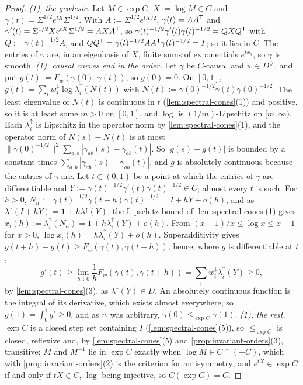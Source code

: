 \begin{proof}
\emph{(1), the geodesic.} Let $M \in \exp C$, $X := \log M \in C$ and $\gamma(t) = \Sigma^{1/2}e^{tX}\Sigma^{1/2}$.
With $A := \Sigma^{1/2}e^{tX/2}$, $\gamma(t) = AA^{\mathsf{T}}$ and $\gamma'(t) = \Sigma^{1/2}Xe^{tX}\Sigma^{1/2} =
AXA^{\mathsf{T}}$, so $\gamma(t)^{-1/2}\gamma'(t)\gamma(t)^{-1/2} = QXQ^{\mathsf{T}}$ with $Q := \gamma(t)^{-1/2}A$, and
$QQ^{\mathsf{T}} = \gamma(t)^{-1/2}AA^{\mathsf{T}}\gamma(t)^{-1/2} = I$; so it lies in $C$. The entries of $\gamma$ are, in an
eigenbasis of $X$, finite sums of exponentials $e^{tx_k}$, so $\gamma$ is smooth.
\emph{(1), causal curves end in the order.} Let $\gamma$ be $C$-causal and $w \in D^\#$, and put
$g(t) := F_w(\gamma(0), \gamma(t))$, so $g(0) = 0$. On $[0,1]$, $g(t) = \sum_iw^\downarrow_i\log
\lambda^\uparrow_i(N(t))$ with $N(t) := \gamma(0)^{-1/2}\gamma(t)\gamma(0)^{-1/2}$. The least eigenvalue of
$N(t)$ is continuous in $t$ (\ref{lem:spectral-cones}(1)) and positive, so it is at least some $m > 0$ on
$[0,1]$, and $\log$ is $(1/m)$-Lipschitz on $[m, \infty)$. Each $\lambda^\uparrow_i$ is Lipschitz in the
operator norm by \ref{lem:spectral-cones}(1), and the operator norm of $N(s) - N(t)$ is at most
$\|\gamma(0)^{-1/2}\|^2\sum_{a,b}|\gamma_{ab}(s) - \gamma_{ab}(t)|$. So $|g(s) - g(t)|$ is bounded by a
constant times $\sum_{a,b}|\gamma_{ab}(s) - \gamma_{ab}(t)|$, and $g$ is absolutely continuous because the
entries of $\gamma$ are. Let $t \in (0,1)$ be a point at which the entries of $\gamma$ are differentiable and
$Y := \gamma(t)^{-1/2}\gamma'(t)\gamma(t)^{-1/2} \in C$; almost every $t$ is such. For $h > 0$,
$N_h := \gamma(t)^{-1/2}\gamma(t+h)\gamma(t)^{-1/2} = I + hY + o(h)$, and as $\lambda^\uparrow(I + hY) =
\mathbf 1 + h\lambda^\uparrow(Y)$, the Lipschitz bound of \ref{lem:spectral-cones}(1) gives
$x_i(h) := \lambda^\uparrow_i(N_h) = 1 + h\lambda^\uparrow_i(Y) + o(h)$. From $(x - 1)/x \le \log x \le x - 1$
for $x > 0$, $\log x_i(h) = h\lambda^\uparrow_i(Y) + o(h)$. Superadditivity gives
$g(t+h) - g(t) \ge F_w(\gamma(t), \gamma(t+h))$, hence, where $g$ is differentiable at $t$,
\[
  g'(t) \ge \lim_{h\downarrow0}\frac1hF_w(\gamma(t), \gamma(t+h)) = \sum_iw^\downarrow_i\lambda^\uparrow_i(Y) \ge 0 ,
\]
by \ref{lem:spectral-cones}(3), as $\lambda^\uparrow(Y) \in D$. An absolutely continuous function is the
integral of its derivative, which exists almost everywhere; so $g(1) = \int_0^1g' \ge 0$, and as $w$ was
arbitrary, $\gamma(0) \le_{\exp C} \gamma(1)$. \emph{(1), the rest.} $\exp C$ is a closed step set
containing $I$ (\ref{lem:spectral-cones}(5)), so $\le_{\exp C}$ is closed, reflexive and, by
\ref{lem:spectral-cones}(5) and \ref{prop:invariant-orders}(3), transitive; $M$ and $M^{-1}$ lie in
$\exp C$ exactly when $\log M \in C \cap (-C)$, which with \ref{prop:invariant-orders}(2) is the criterion
for antisymmetry; and $e^{tX} \in \exp C$ if and only if $tX \in C$, $\log$ being injective, so
$C(\exp C) = C$.


\end{proof}
